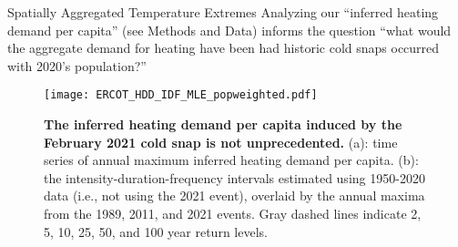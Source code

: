 \begin{block}{Spatially Aggregated Temperature Extremes}
    Analyzing our ``inferred heating demand per capita'' (see Methods and Data) informs the question ``what would the aggregate demand for heating have been had historic cold snaps occurred with 2020's population?''
    \begin{framed}
        \begin{figure}
            \centering
            \texttt{[image: ERCOT\_HDD\_IDF\_MLE\_popweighted.pdf]}\\
            \caption{
                \textbf{The inferred heating demand per capita induced by the February 2021 cold snap is not unprecedented.}
                (a): time series of annual maximum inferred heating demand per capita.
                (b): the intensity-duration-frequency intervals estimated using 1950-2020 data (i.e., not using the 2021 event), overlaid by the annual maxima from the 1989, 2011, and 2021 events.
                Gray dashed lines indicate 2, 5, 10, 25, 50, and 100 year return levels.
            }\label{fig:idf_weighted}
        \end{figure}
    \end{framed}
\end{block}